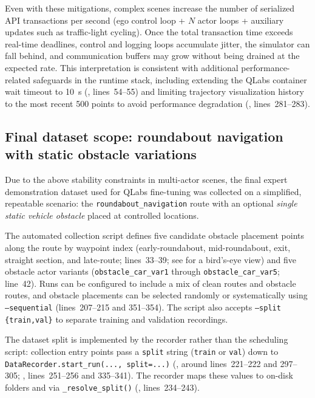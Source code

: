 Even with these mitigations, complex scenes increase the number of serialized API transactions per second (ego control loop + $N$ actor loops + auxiliary updates such as traffic-light cycling). Once the total transaction time exceeds real-time deadlines, control and logging loops accumulate jitter, the simulator can fall behind, and communication buffers may grow without being drained at the expected rate.
This interpretation is consistent with additional performance-related safeguards in the runtime stack, including extending the QLabs container wait timeout to 10~s (, lines~54--55) and limiting trajectory visualization history to the most recent 500 points to avoid performance degradation (, lines~281--283).

\subsection{Final dataset scope: roundabout navigation with static obstacle variations}
\label{sec:final-dataset-scope}
Due to the above stability constraints in multi-actor scenes, the final expert demonstration dataset used for QLabs fine-tuning was collected on a simplified, repeatable scenario: the \texttt{roundabout\_navigation} route with an optional \emph{single static vehicle obstacle} placed at controlled locations.

The automated collection script  defines five candidate obstacle placement points along the route by waypoint index (early-roundabout, mid-roundabout, exit, straight section, and late-route; lines~33--39; see  for a bird's-eye view) and five obstacle actor variants (\texttt{obstacle\_car\_var1} through \texttt{obstacle\_car\_var5}; line~42). Runs can be configured to include a mix of clean routes and obstacle routes, and obstacle placements can be selected randomly or systematically using \texttt{--sequential} (lines~207--215 and 351--354). The script also accepts \texttt{--split \{train,val\}} to separate training and validation recordings.

The dataset split is implemented by the recorder rather than the scheduling script: collection entry points pass a \texttt{split} string (\texttt{train} or \texttt{val}) down to \texttt{DataRecorder.start\_run(..., split=...)} (, around lines~221--222 and 297--305; , lines~251--256 and 335--341). The recorder maps these values to on-disk folders  and  via \texttt{\_resolve\_split()} (, lines~234--243).

